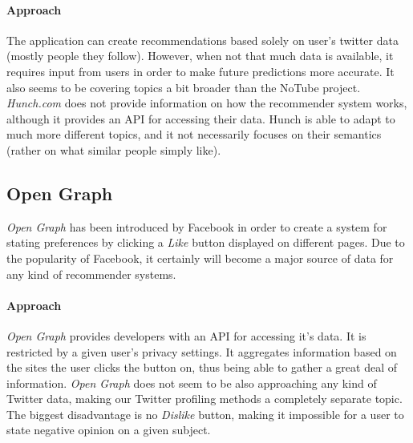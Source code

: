 \paragraph{Approach}
The application can create recommendations based solely on user's twitter data (mostly people they follow). However, when not that much data is available, it requires input from users in order to make future predictions more accurate. It also seems to be covering topics a bit broader than the NoTube project.
\textit{Hunch.com} does not provide information on how the recommender system works, although it provides an API for accessing their data.
Hunch is able to adapt to much more different topics, and it not necessarily focuses on their semantics (rather on what similar people simply like).

\subsection{Open Graph}
\textit{Open Graph} has been introduced by Facebook in order to create a system for stating preferences by clicking a \textit{Like} button displayed on different pages. Due to the popularity of Facebook, it certainly will become a major source of data for any kind of recommender systems.

\paragraph{Approach}
\textit{Open Graph} provides developers with an API for accessing it's data. It is restricted by a given user's privacy settings.
It aggregates information based on the sites the user clicks the button on, thus being able to gather a great deal of information. \textit{Open Graph} does not seem to be also approaching any kind of Twitter data, making our Twitter profiling methods a completely separate topic.
The biggest disadvantage is no \textit{Dislike} button, making it impossible for a user to state negative opinion on a given subject.


